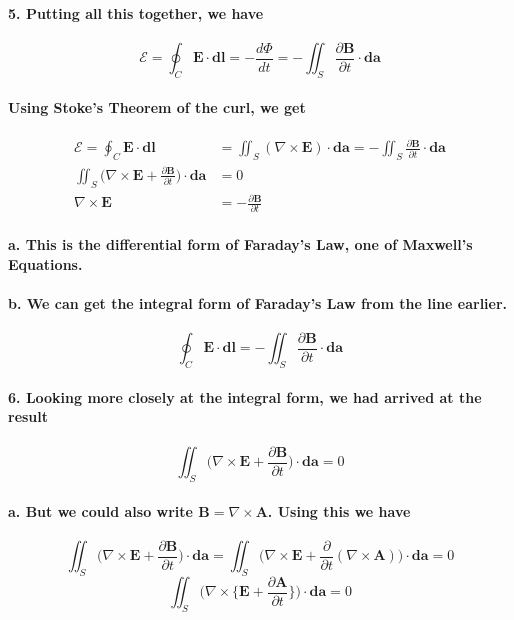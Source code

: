 \documentclass{article}
\begin{document}
\paragraph{5. Putting all this together, we have}
\begin{equation*}
    \mathcal{E}=\oint_C\boldsymbol{E}\cdot\boldsymbol{dl}=-\frac{d\Phi}{dt}=-\iint_S\frac{\partial\boldsymbol{B}}{\partial t}\cdot\boldsymbol{da}
\end{equation*}
\paragraph{\indent Using Stoke's Theorem of the curl, we get}
\begin{align*}
    \mathcal{E}=\oint_C\boldsymbol{E}\cdot\boldsymbol{dl}&=\iint_S(\nabla\times\boldsymbol{E})\cdot\boldsymbol{da}=-\iint_S\frac{\partial\boldsymbol{B}}{\partial t}\cdot\boldsymbol{da}\\
    \iint_S\bigg(\nabla\times\boldsymbol{E}+\frac{\partial\boldsymbol{B}}{\partial t}\bigg)\cdot\boldsymbol{da}&=0\\
    \nabla\times\boldsymbol{E}&=-\frac{\partial \boldsymbol{B}}{\partial t}
\end{align*}
\paragraph{\indent a. This is the differential form of Faraday's Law, one of Maxwell's Equations.}
\paragraph{\indent b. We can get the integral form of Faraday's Law from the line earlier.}
\begin{equation*}
    \oint_C\boldsymbol{E}\cdot\boldsymbol{dl}=-\iint_S\frac{\partial\boldsymbol{B}}{\partial t}\cdot \boldsymbol{da}
\end{equation*}
\paragraph{6. Looking more closely at the integral form, we had arrived at the result}
\begin{equation*}
    \iint_S\bigg( \nabla\times\boldsymbol{E}+\frac{\partial\boldsymbol{B}}{\partial t}\bigg)\cdot\boldsymbol{da}=0
\end{equation*}
\paragraph{\indent a. But we could also write $\boldsymbol{B}=\nabla\times\boldsymbol{A}$. Using this we have}
\begin{equation*}
    \iint_S\bigg(\nabla\times\boldsymbol{E}+\frac{\partial\boldsymbol{B}}{\partial t}\bigg)\cdot\boldsymbol{da}=\iint_S\bigg(\nabla\times\boldsymbol{E}+\frac{\partial}{\partial t}(\nabla\times\boldsymbol{A})\bigg)\cdot\boldsymbol{da}=0
\end{equation*}
\begin{equation*}
    \iint_S\bigg(\nabla\times\bigg\{ \boldsymbol{E}+\frac{\partial\boldsymbol{A}}{\partial t}\bigg\}\bigg)\cdot\boldsymbol{da}=0
\end{equation*}
\end{document}
